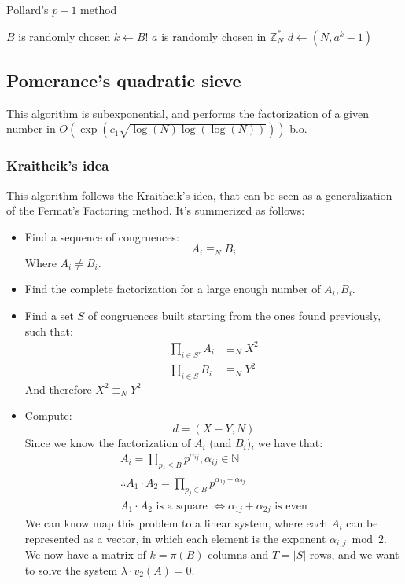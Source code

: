 \begin{algorithm}
\caption{Pollard's $p-1$ method}\label{alg:pollard_p-1_method}
$B$ is randomly chosen\label{pol_p_step_0}\;
$k \gets B!$\;\label{pol_p_step_1}
$a$ is randomly chosen in $\mathbb{Z}_{N}^{*}$\;\label{pol_p_step_2}
$d \gets (N, a^{k} - 1)$\;\label{pol_p_step_3}
\end{algorithm}

\subsection{Pomerance's quadratic sieve}
This algorithm is subexponential, and performs the factorization of a given number in $O(\operatorname{exp}(c_{1}\sqrt{\operatorname{log}(N)\operatorname{log}(\operatorname{log}(N))}))$ b.o.
\subsubsection{Kraithcik's idea}
This algorithm follows the Kraithcik's idea, that can be seen as a generalization of the Fermat's Factoring method. It's summerized as follows:
\begin{itemize}
    \item Find a sequence of congruences:
    \[A_{i} \equiv_{N} B_{i}\]
    Where $A_{i} \neq B_{i}$.
    \item Find the complete factorization for a large enough number of $A_{i}, B_{i}$.
    \item Find a set $S$ of congruences built starting from the ones found previously, such that:
    \begin{align*}
        \prod_{i \in S'} A_{i} &\equiv_{N} X^{2} \\
        \prod_{i \in S} B_{i} &\equiv_{N} Y^{2}
    \end{align*}
    And therefore $X^{2} \equiv_{N} Y^{2}$
    \item Compute:
    \[ d = (X - Y, N)\]
    Since we know the factorization of $A_{i}$ (and $B_{i}$), we have that:
    \begin{align*}
        A_{i} = \prod_{p_{j} \leq B} p^{\alpha_{ij}}, \alpha_{ij} \in \mathbb{N} \\
        \therefore A_{1} \cdot A_{2} = \prod_{p_{j} \in B} p^{\alpha_{1j} + \alpha_{2j}} \\
        A_{1} \cdot A_{2} \text{ is a square } \iff \alpha_{1j} + \alpha_{2j} \text{ is even}
    \end{align*}
    We can know map this problem to a linear system, where each $A_{i}$ can be represented as a vector, in which each element is the exponent $\alpha_{i,j} \bmod 2$. \newline
    We now have a matrix of $k = \pi(B)$ columns and $T = |S|$ rows, and we want to solve the system $\lambda \cdot v_{2}(A)= 0$.
\end{itemize}
